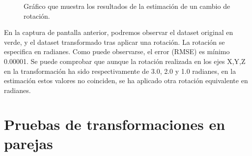 \begin{figure}[H]
\begin{center}
\hspace{0.5cm}

\end{center}

\caption{Gráfico que muestra los resultados de la estimación de un cambio de rotación.}
\end{figure}

En la captura de pantalla anterior, podremos observar el dataset original en verde, y el dataset transformado tras aplicar una rotación. La rotación se especifica en radianes. Como puede observarse, el error (RMSE) es mínimo 0.00001. Se puede comprobar que aunque la rotación realizada en los ejes X,Y,Z en la transformación ha sido respectivamente de 3.0, 2.0 y 1.0 radianes, en la estimación estos valores no coinciden, se ha aplicado otra rotación equivalente en radianes.



\section{Pruebas de transformaciones en parejas}

